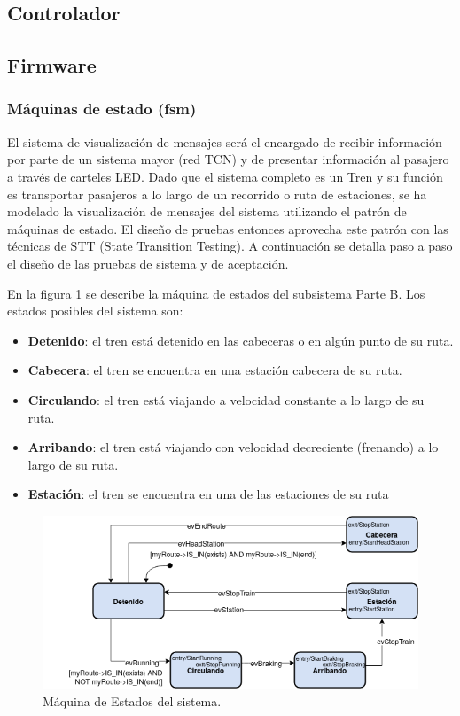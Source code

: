 \documentclass[
11pt, %
]{charter}
\begin{document}
\subsection{Controlador}


\subsection{Firmware}

\subsubsection{Máquinas de estado (fsm)}
El sistema de visualización de mensajes será el encargado de recibir información por parte de un sistema mayor (red TCN) y de presentar información al pasajero a través de carteles LED. Dado que el sistema completo es un Tren y su función es transportar pasajeros a lo largo de un recorrido o ruta de
estaciones, se ha modelado la visualización de mensajes del sistema  utilizando el patrón de máquinas de estado. El diseño de pruebas entonces aprovecha este patrón con las técnicas de STT
(State Transition Testing). A continuación se detalla paso a paso el diseño de las pruebas de sistema y de aceptación. 

En la figura \ref{fig:Statechart} se describe la máquina de estados del subsistema Parte B. Los estados posibles
del sistema son:
\begin{itemize}
\item \textbf{Detenido}: el tren está detenido en las cabeceras o en algún punto de su ruta.
\item \textbf{Cabecera}: el tren se encuentra en una estación cabecera de su ruta.
\item \textbf{Circulando}: el tren está viajando a velocidad constante a lo largo de su ruta.
\item \textbf{Arribando}: el tren está viajando con velocidad decreciente (frenando) a lo largo de su
ruta.
\item \textbf{Estación}: el tren se encuentra en una de las estaciones de su ruta
\end{itemize}

\begin{figure}[htpb]
\centering 
\includegraphics[width=1\textwidth]{./Pics/Statechart.png}
\caption{Máquina de Estados del sistema.}
\label{fig:Statechart}
\end{figure}
\end{document}
